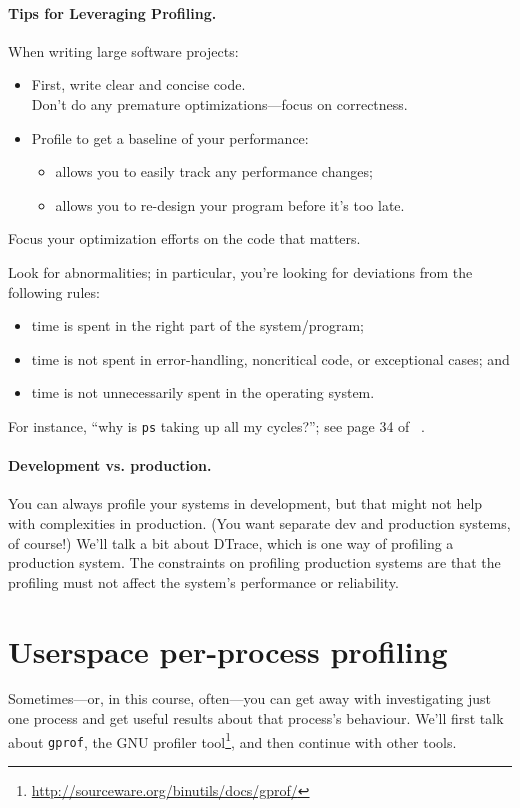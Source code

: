 \paragraph{Tips for Leveraging Profiling.}
When writing large software projects:
  \begin{itemize}
    \item First, write clear and concise code. \\
      Don't do any premature optimizations---focus on correctness.
    \item Profile to get a baseline of your performance:
      \begin{itemize}
        \item allows you to easily track any performance changes;
        \item allows you to re-design your program before it's too late.
      \end{itemize}
  \end{itemize}
Focus your optimization efforts on the code that matters.

Look for abnormalities; in particular, you're looking for
deviations from the following rules:
\begin{itemize}
\item time is spent in the right part of the system/program;
\item time is not spent in error-handling, noncritical code, or exceptional cases; and
\item time is not unnecessarily spent in the operating system.
\end{itemize}
For instance, ``why is {\tt ps} taking up all my cycles?'';
see page 34 of ~\cite{300ps}.

\paragraph{Development vs. production.}
You can always profile your systems in development, but that might not
help with complexities in production. (You want separate dev and
production systems, of course!) We'll talk a bit about DTrace, which
is one way of profiling a production system. The constraints on profiling 
production systems are that the profiling must not affect the system's
performance or reliability.

\section*{Userspace per-process profiling}
Sometimes---or, in this course, often---you can get away with
investigating just one process and get useful results about that
process's behaviour.  We'll first talk about {\tt gprof}, the GNU
profiler
tool\footnote{\url{http://sourceware.org/binutils/docs/gprof/}}, and
then continue with other tools.

